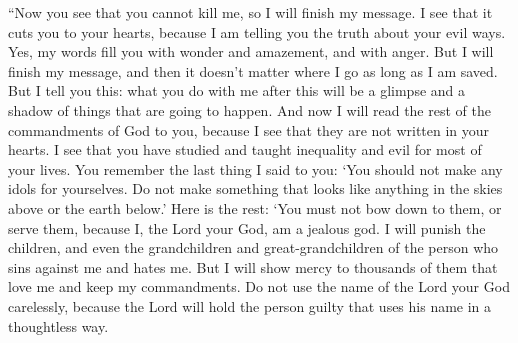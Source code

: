 ``Now you see that you cannot kill me, so I will finish my message. I see that it cuts you to your hearts, because I am telling you the truth about your evil ways.
\bverse \iffalse Yea, and my words fill you with wonder and amazement, and with anger. \fi
Yes, my words fill you with wonder and amazement, and with anger.
\bverse \iffalse But I finish my message; and then it matters not whither I go, if it so be that I am saved. \fi
But I will finish my message, and then it doesn't matter where I go as long as I am saved.
\bverse \iffalse But this much I tell you, what you do with me, after this, shall be as a type and a shadow of things which are to come. \fi
But I tell you this: what you do with me after this will be a glimpse and a shadow of things that are going to happen.
\bverse \iffalse And now I read unto you the remainder of the commandments of God, for I perceive that they are not written in your hearts; I perceive that ye have studied and taught iniquity the most part of your lives. \fi
And now I will read the rest of the commandments of God to you, because I see that they are not written in your hearts. I see that you have studied and taught inequality and evil for most of your lives.
\bverse \iffalse And now, ye remember that I said unto you: Thou shall not make unto thee any graven image, or any likeness of things which are in heaven above, or which are in the earth beneath, or which are in the water under the earth. \fi
You remember the last thing I said to you: \lq You should not make any idols for yourselves. Do not make something that looks like anything in the skies above or the earth below.\rq
\bverse \iffalse And again: Thou shalt not bow down thyself unto them, nor serve them; for I the Lord thy God am a jealous God, visiting the iniquities of the fathers upon the children, unto the third and fourth generations of them that hate me; \fi
Here is the rest: \lq You must not bow down to them, or serve them, because I, the Lord your God, am a jealous god. I will punish the children, and even the grandchildren and great-grandchildren of the person who sins against me and hates me.
\bverse \iffalse And showing mercy unto thousands of them that love me and keep my commandments. \fi
But I will show mercy to thousands of them that love me and keep my commandments.
\bverse \iffalse Thou shalt not take the name of the Lord thy God in vain; for the Lord will not hold him guiltless that taketh his name in vain. \fi
Do not use the name of the Lord your God carelessly, because the Lord will hold the person guilty that uses his name in a thoughtless way.
